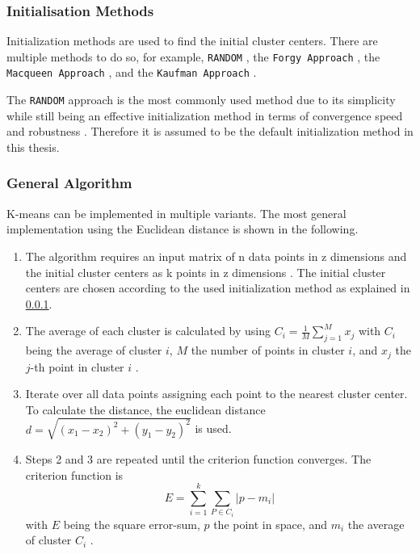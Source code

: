 \subsubsection{Initialisation Methods}
\label{subsec:initialisation_methods}
Initialization methods are used to find the initial cluster centers.
There are multiple methods to do so, for example, \texttt{RANDOM} \cite{PEN-ECI}, the \texttt{Forgy Approach} \cite{AND-CAA}, the \texttt{Macqueen Approach} \cite{MCQ-MCA}, and the \texttt{Kaufman Approach} \cite{KAU-FGD}.

The \texttt{RANDOM} approach is the most commonly used method due to its simplicity while still being an effective initialization method in terms of convergence speed and robustness \cite{PEN-ECI}.
Therefore it is assumed to be the default initialization method in this thesis.

\subsubsection{General Algorithm}
\label{subsec:general_algorithm}
K-means can be implemented in multiple variants.
The most general implementation using the Euclidean distance is shown in the following.
\begin{enumerate}
    \item The algorithm requires an input matrix of n data points in z dimensions and the initial cluster centers as k points in z dimensions \cite{HAR-KMA}.
          The initial cluster centers are chosen according to the used initialization method as explained in \ref{subsec:initialisation_methods}.
    \item The average of each cluster is calculated by using $C_i = \frac{1}{M} \sum_{j=1}^{M}x_j$ with $C_i$ being the average of cluster $i$, $M$ the number of points in cluster $i$, and $x_j$ the $j$-th point in cluster $i$ \cite{SYA-IKC}.
    \item Iterate over all data points assigning each point to the nearest cluster center.
          To calculate the distance, the euclidean distance $d = \sqrt{(x_1-x_2)^2+(y_1-y_2)^2}$ is used.
    \item Steps 2 and 3 are repeated until the criterion function converges.
          The criterion function is \begin{equation}\label{eq:sse}E=\sum_{i=1}^{k} \sum_{P \in C_i}|p-m_i|\end{equation} with $E$ being the square error-sum, $p$ the point in space, and $m_i$ the average of cluster $C_i$ \cite{LIU-BDE}.
\end{enumerate}

